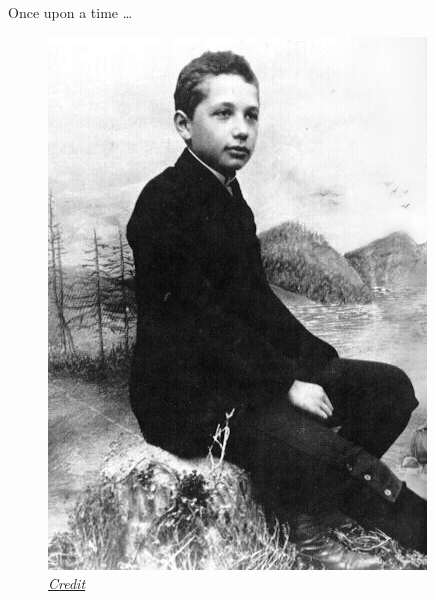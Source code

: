 \begin{frame}{Once upon a time \ldots}

\begin{figure}
\includegraphics[scale=0.35]{figures/Albert_Einstein_child}
\caption*{\href{By Unknown - http://faculty.randolphcollege.edu/tmichalik/einstein.htm, Public Domain, https://commons.wikimedia.org/w/index.php?curid=3850884}{\emph{Credit}}}
\end{figure}

\end{frame}


